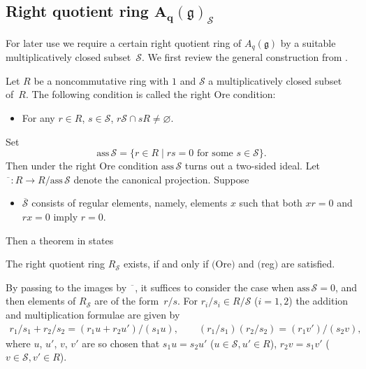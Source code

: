 \documentclass[pdftex]{sigma}
\newcommand{\geh}{\mathfrak{g}}
\begin{document}
\subsection[Right quotient ring $A_q(\geh)_\mathcal{S}$]{Right quotient ring $\boldsymbol{A_q(\geh)_\mathcal{S}}$}

For later use we require a certain right quotient ring of $A_q(\geh)$ by a suitable multiplicatively
closed subset~$\mathcal{S}$. We f\/irst review the general construction from \cite[Chapter~2]{McCoRob}.

Let $R$ be a noncommutative ring with $1$ and $\mathcal{S}$ a multiplicatively closed subset of~$R$.
The following condition is called the right Ore condition:
\begin{itemize}\itemsep=0pt
\item[(Ore)] For any $r\in R$, $s\in\mathcal{S}$, $r\mathcal{S}\cap sR\neq\varnothing$.
\end{itemize}
Set
\[
\mathrm{ass}\,\mathcal{S}=\{r\in R\mid rs=0\mbox{ for some }s\in\mathcal{S}\}.
\]
Then under the right Ore condition $\mathrm{ass}\,\mathcal{S}$ turns out a two-sided ideal.
Let $\overline{\phantom{a}}:R\rightarrow R/\mathrm{ass}\,\mathcal{S}$ denote the canonical projection.
Suppose
\begin{itemize}\itemsep=0pt
\item[(reg)] $\overline{\mathcal{S}}$ consists of regular elements, namely, elements $x$ such that
both $xr=0$ and $rx=0$ imply $r=0$.
\end{itemize}
Then a theorem in \cite[Chapter~2]{McCoRob} states

\begin{theorem} \label{th:McCoRob}
The right quotient ring $R_\mathcal{S}$ exists, if and only if $($Ore$)$ and $($reg$)$ are satisfied.
\end{theorem}

By passing to the images by $\overline{\phantom{a}}$, it suf\/f\/ices to consider the case when
$\mathrm{ass}\,\mathcal{S}=0$, and then elements of $R_\mathcal{S}$ are of the form~$r/s$.
For $r_i/s_i\in R/\mathcal{S}$ ($i=1,2$) the addition and multiplication formulae are given by
\begin{gather}\label{add-mult}
r_1/s_1+r_2/s_2=(r_1u+r_2u')/(s_1u),\qquad (r_1/s_1)(r_2/s_2)=(r_1v')/(s_2v),
\end{gather}
where $u$, $u'$, $v$, $v'$ are so chosen that $s_1u=s_2u'$ ($u\in\mathcal{S},u'\in R$), $r_2v=s_1v'$
($v\in\mathcal{S},v'\in R$).
\end{document}

